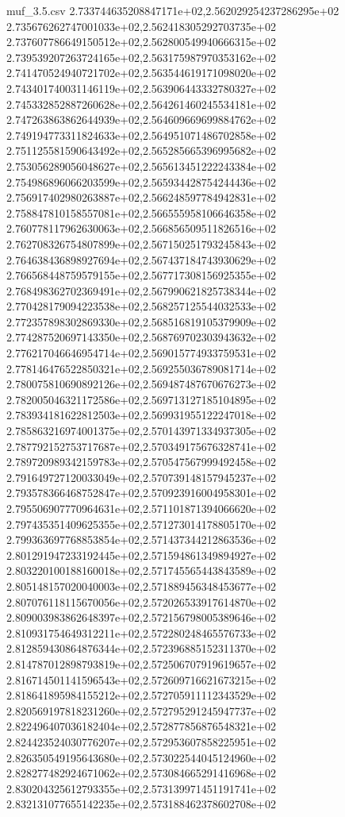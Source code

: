 \begin{filecontents*}{muf_3.5.csv}
2.733744635208847171e+02,2.562029254237286295e+02
2.735676262747001033e+02,2.562418305292703735e+02
2.737607786649150512e+02,2.562800549940666315e+02
2.739539207263724165e+02,2.563175987970353162e+02
2.741470524940721702e+02,2.563544619171098020e+02
2.743401740031146119e+02,2.563906443332780327e+02
2.745332852887260628e+02,2.564261460245534181e+02
2.747263863862644939e+02,2.564609669699884762e+02
2.749194773311824633e+02,2.564951071486702858e+02
2.751125581590643492e+02,2.565285665396995682e+02
2.753056289056048627e+02,2.565613451222243384e+02
2.754986896066203599e+02,2.565934428754244436e+02
2.756917402980263887e+02,2.566248597784942831e+02
2.758847810158557081e+02,2.566555958106646358e+02
2.760778117962630063e+02,2.566856509511826516e+02
2.762708326754807899e+02,2.567150251793245843e+02
2.764638436898927694e+02,2.567437184743930629e+02
2.766568448759579155e+02,2.567717308156925355e+02
2.768498362702369491e+02,2.567990621825738344e+02
2.770428179094223538e+02,2.568257125544032533e+02
2.772357898302869330e+02,2.568516819105379909e+02
2.774287520697143350e+02,2.568769702303943632e+02
2.776217046646954714e+02,2.569015774933759531e+02
2.778146476522850321e+02,2.569255036789081714e+02
2.780075810690892126e+02,2.569487487670676273e+02
2.782005046321172586e+02,2.569713127185104895e+02
2.783934181622812503e+02,2.569931955122247018e+02
2.785863216974001375e+02,2.570143971334937305e+02
2.787792152753717687e+02,2.570349175676328741e+02
2.789720989342159783e+02,2.570547567999492458e+02
2.791649727120033049e+02,2.570739148157945237e+02
2.793578366468752847e+02,2.570923916004958301e+02
2.795506907770964631e+02,2.571101871394066620e+02
2.797435351409625355e+02,2.571273014178805170e+02
2.799363697768853854e+02,2.571437344212863536e+02
2.801291947233192445e+02,2.571594861349894927e+02
2.803220100188160018e+02,2.571745565443843589e+02
2.805148157020040003e+02,2.571889456348453677e+02
2.807076118115670056e+02,2.572026533917614870e+02
2.809003983862648397e+02,2.572156798005389646e+02
2.810931754649312211e+02,2.572280248465576733e+02
2.812859430864876344e+02,2.572396885152311370e+02
2.814787012898793819e+02,2.572506707919619657e+02
2.816714501141596543e+02,2.572609716621673215e+02
2.818641895984155212e+02,2.572705911112343529e+02
2.820569197818231260e+02,2.572795291245947737e+02
2.822496407036182404e+02,2.572877856876548321e+02
2.824423524030776207e+02,2.572953607858225951e+02
2.826350549195643680e+02,2.573022544045124960e+02
2.828277482924671062e+02,2.573084665291416968e+02
2.830204325612793355e+02,2.573139971451191741e+02
2.832131077655142235e+02,2.573188462378602708e+02

\end{filecontents*}

